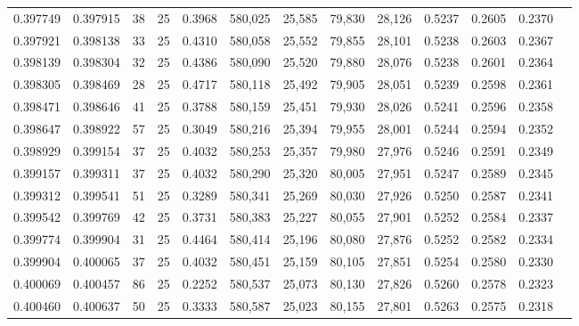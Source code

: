 \begin{tabular}{rrrrrrrrrrrrr}
0.397749 & 0.397915 &    38 &  25 &                                     0.3968 & 580,025 &  25,585 &  79,830 &  28,126 & 0.5237 & 0.2605 & 0.2370 \\
0.397921 & 0.398138 &    33 &  25 &                                     0.4310 & 580,058 &  25,552 &  79,855 &  28,101 & 0.5238 & 0.2603 & 0.2367 \\
0.398139 & 0.398304 &    32 &  25 &                                     0.4386 & 580,090 &  25,520 &  79,880 &  28,076 & 0.5238 & 0.2601 & 0.2364 \\
0.398305 & 0.398469 &    28 &  25 &                                     0.4717 & 580,118 &  25,492 &  79,905 &  28,051 & 0.5239 & 0.2598 & 0.2361 \\
0.398471 & 0.398646 &    41 &  25 &                                     0.3788 & 580,159 &  25,451 &  79,930 &  28,026 & 0.5241 & 0.2596 & 0.2358 \\
0.398647 & 0.398922 &    57 &  25 &                                     0.3049 & 580,216 &  25,394 &  79,955 &  28,001 & 0.5244 & 0.2594 & 0.2352 \\
0.398929 & 0.399154 &    37 &  25 &                                     0.4032 & 580,253 &  25,357 &  79,980 &  27,976 & 0.5246 & 0.2591 & 0.2349 \\
0.399157 & 0.399311 &    37 &  25 &                                     0.4032 & 580,290 &  25,320 &  80,005 &  27,951 & 0.5247 & 0.2589 & 0.2345 \\
0.399312 & 0.399541 &    51 &  25 &                                     0.3289 & 580,341 &  25,269 &  80,030 &  27,926 & 0.5250 & 0.2587 & 0.2341 \\
0.399542 & 0.399769 &    42 &  25 &                                     0.3731 & 580,383 &  25,227 &  80,055 &  27,901 & 0.5252 & 0.2584 & 0.2337 \\
0.399774 & 0.399904 &    31 &  25 &                                     0.4464 & 580,414 &  25,196 &  80,080 &  27,876 & 0.5252 & 0.2582 & 0.2334 \\
0.399904 & 0.400065 &    37 &  25 &                                     0.4032 & 580,451 &  25,159 &  80,105 &  27,851 & 0.5254 & 0.2580 & 0.2330 \\
0.400069 & 0.400457 &    86 &  25 &                                     0.2252 & 580,537 &  25,073 &  80,130 &  27,826 & 0.5260 & 0.2578 & 0.2323 \\
0.400460 & 0.400637 &    50 &  25 &                                     0.3333 & 580,587 &  25,023 &  80,155 &  27,801 & 0.5263 & 0.2575 & 0.2318 \\

\end{tabular}
